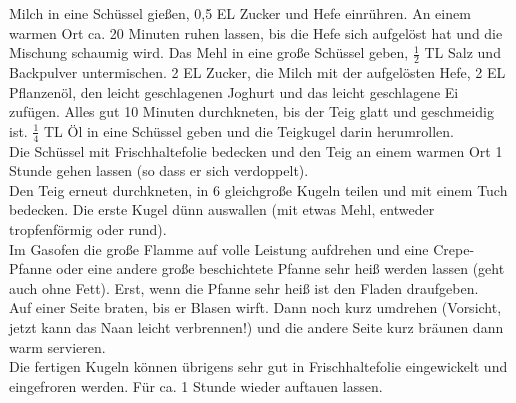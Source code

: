 \documentclass[a6paper, twoside]{report}
\begin{document}
\vspace*{\fill}
\begin{multicols}{2}



Milch in eine Schüssel gießen, 0,5 EL Zucker und Hefe einrühren.
An einem warmen Ort ca. 20 Minuten ruhen lassen, bis die Hefe sich aufgelöst hat und die Mischung schaumig wird.
Das Mehl in eine große Schüssel geben, $\frac{1}{2}$ TL Salz und Backpulver untermischen. 2 EL Zucker, 
die Milch mit der aufgelösten Hefe, 2 EL Pflanzenöl, den leicht geschlagenen Joghurt 
und das leicht geschlagene Ei zufügen. Alles gut 10 Minuten durchkneten, bis der Teig glatt und geschmeidig ist.
$\frac{1}{4}$ TL Öl in eine Schüssel geben und die Teigkugel darin herumrollen.\\

Die Schüssel mit Frischhaltefolie bedecken und den Teig an einem warmen Ort 1 Stunde gehen lassen 
(so dass er sich verdoppelt).\\

Den Teig erneut durchkneten, in 6 gleichgroße Kugeln teilen und mit einem Tuch bedecken.
Die erste Kugel dünn auswallen (mit etwas Mehl, entweder tropfenförmig oder rund).\\
 
Im Gasofen die große Flamme auf volle Leistung aufdrehen und eine Crepe-Pfanne oder eine 
andere große beschichtete Pfanne sehr heiß werden lassen (geht auch ohne Fett). 
Erst, wenn die Pfanne sehr heiß ist den Fladen draufgeben.\\

Auf einer Seite braten, bis er Blasen wirft. Dann noch kurz umdrehen (Vorsicht, jetzt kann das Naan leicht verbrennen!) 
und die andere Seite kurz bräunen dann warm servieren.\\ 

Die fertigen Kugeln können übrigens sehr gut in Frischhaltefolie eingewickelt und eingefroren werden. 
Für ca. 1 Stunde wieder auftauen lassen. 



\end{multicols}
\vfill
\end{document}
